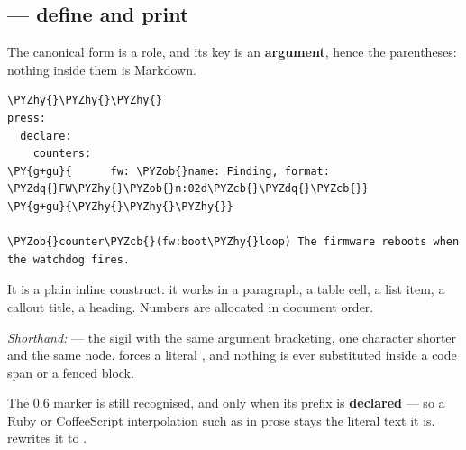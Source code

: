 \documentclass[a4paper,twoside]{article}
\begin{document}
\subsection{ --- define and print}
The canonical form is a role, and its key is an \textbf{argument}, hence the
parentheses: nothing inside them is Markdown.
\begin{tscode}[lang=md, engine=pygments]
\begin{Verbatim}[commandchars=\\\{\},breaklines, breakanywhere, commandchars=\\\{\}]
\PYZhy{}\PYZhy{}\PYZhy{}
press:
  declare:
    counters:
\PY{g+gu}{      fw: \PYZob{}name: Finding, format: \PYZdq{}FW\PYZhy{}\PYZob{}n:02d\PYZcb{}\PYZdq{}\PYZcb{}}
\PY{g+gu}{\PYZhy{}\PYZhy{}\PYZhy{}}

\PYZob{}counter\PYZcb{}(fw:boot\PYZhy{}loop) The firmware reboots when the watchdog fires.
\end{Verbatim}
\end{tscode}
It is a plain inline construct: it works in a paragraph, a table cell, a list
item, a callout title, a heading. Numbers are allocated in document order.

\emph{Shorthand:}  --- the \tscodeinline{\#} sigil with the same argument
bracketing, one character shorter and the same node. \tscodeinline{\textbackslash{}\#} forces a literal
\tscodeinline{\#}, and nothing is ever substituted inside a code span or a fenced block.
\begin{tscallout}[kind=note, title={\tscodeinline{\#\{prefix:key\}} is deprecated}]
The 0.6 marker is still recognised, and only when its prefix is
\textbf{declared} --- so a Ruby or CoffeeScript interpolation such as
 in prose stays the literal text it is. 
rewrites it to .
\end{tscallout}
\end{document}
